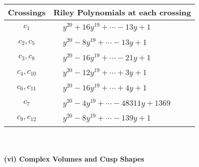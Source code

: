 \documentclass[1p]{elsarticle_modified}
\theoremstyle{definition}
\begin{document}
\begin{tabular}{m{50pt}|m{274pt}}
Crossings & \hspace{64pt}Riley Polynomials at each crossing \\
\hline $$\begin{aligned}c_{1}\end{aligned}$$&$\begin{aligned}
&y^{20}+16 y^{19}+\cdots-13 y+1
\end{aligned}$\\
\hline $$\begin{aligned}c_{2},c_{5}\end{aligned}$$&$\begin{aligned}
&y^{20}-8 y^{19}+\cdots-13 y+1
\end{aligned}$\\
\hline $$\begin{aligned}c_{3},c_{8}\end{aligned}$$&$\begin{aligned}
&y^{20}-16 y^{19}+\cdots-21 y+1
\end{aligned}$\\
\hline $$\begin{aligned}c_{4},c_{10}\end{aligned}$$&$\begin{aligned}
&y^{20}-12 y^{19}+\cdots+3 y+1
\end{aligned}$\\
\hline $$\begin{aligned}c_{6},c_{11}\end{aligned}$$&$\begin{aligned}
&y^{20}-16 y^{19}+\cdots+4 y+1
\end{aligned}$\\
\hline $$\begin{aligned}c_{7}\end{aligned}$$&$\begin{aligned}
&y^{20}-4 y^{19}+\cdots-48311 y+1369
\end{aligned}$\\
\hline $$\begin{aligned}c_{9},c_{12}\end{aligned}$$&$\begin{aligned}
&y^{20}-8 y^{19}+\cdots-139 y+1
\end{aligned}$\\
\hline
\end{tabular}\\~\\
\newpage\flushleft \textbf{(vi) Complex Volumes and Cusp Shapes}
\end{document}
